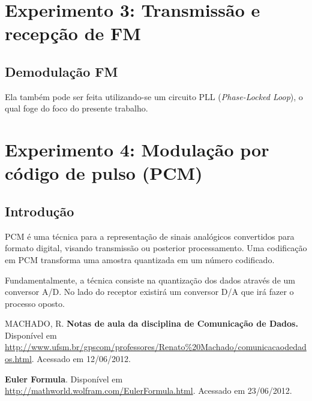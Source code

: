 \documentclass[]{report}
\begin{document}
\chapter{Experimento 3: Transmissão e recepção de FM}
\section{Demodulação FM}
Ela também pode ser feita utilizando-se um circuito PLL (\textit{Phase-Locked Loop}), o qual foge do foco do presente trabalho.
\chapter{Experimento 4: Modulação por código de pulso (PCM)}
\section{Introdução}
PCM é uma técnica para a representação de sinais analógicos convertidos para formato digital, visando transmissão ou posterior processamento. Uma codificação em PCM transforma uma amostra quantizada em um número codificado. \cite{renatodatacom}

Fundamentalmente, a técnica consiste na quantização dos dados através de um conversor A/D. No lado do receptor existirá um conversor D/A que irá fazer o processo oposto.


\begin{thebibliography}{100}
 MACHADO, R. 
 \textbf{Notas de aula da disciplina de Comunicação de Dados.}
 Disponível em \url{http://www.ufsm.br/gpscom/professores/Renato\%20Machado/comunicacaodedados.html}. Acessado em 12/06/2012.
 
 \textbf{Euler Formula}. Disponível em \url{http://mathworld.wolfram.com/EulerFormula.html}. Acessado em 23/06/2012.
\end{thebibliography}
\end{document}
